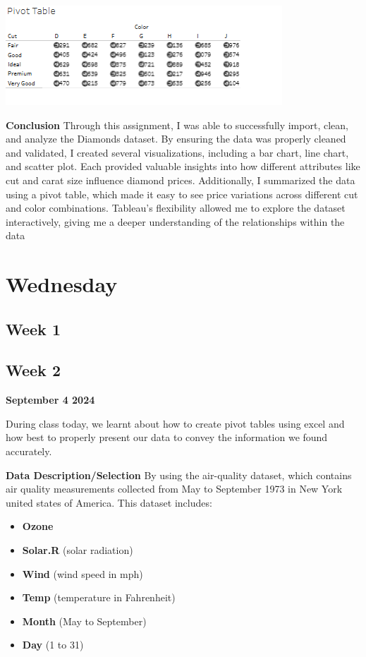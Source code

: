 \documentclass[
  letterpaper,
  DIV=11,
  numbers=noendperiod]{scrreprt}
\providecommand{\tightlist}{%
  \setlength{\itemsep}{0pt}\setlength{\parskip}{0pt}}\usepackage{longtable,booktabs,array}
\begin{document}
\includegraphics{Pivot_Table.png}

\textbf{Conclusion} Through this assignment, I was able to successfully
import, clean, and analyze the Diamonds dataset. By ensuring the data
was properly cleaned and validated, I created several visualizations,
including a bar chart, line chart, and scatter plot. Each provided
valuable insights into how different attributes like cut and carat size
influence diamond prices. Additionally, I summarized the data using a
pivot table, which made it easy to see price variations across different
cut and color combinations. Tableau's flexibility allowed me to explore
the dataset interactively, giving me a deeper understanding of the
relationships within the data

\section{Wednesday}\label{wednesday-3}

\subsection{Week 1}\label{week-1-7}

\subsection{Week 2}\label{week-2-7}

\textbf{September 4 2024}

During class today, we learnt about how to create pivot tables using
excel and how best to properly present our data to convey the
information we found accurately.

\textbf{Data Description/Selection} By using the air-quality dataset,
which contains air quality measurements collected from May to September
1973 in New York united states of America. This dataset includes:

\begin{itemize}
\tightlist
\item
  \textbf{Ozone}
\item
  \textbf{Solar.R} (solar radiation)
\item
  \textbf{Wind} (wind speed in mph)
\item
  \textbf{Temp} (temperature in Fahrenheit)
\item
  \textbf{Month} (May to September)
\item
  \textbf{Day} (1 to 31)
\end{itemize}
\end{document}
